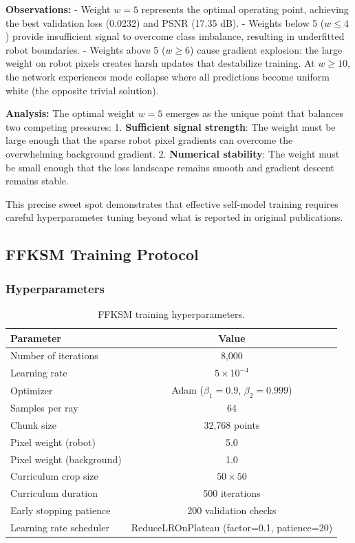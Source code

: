 \documentclass[12pt,a4paper,oneside]{report}
\begin{document}
\textbf{Observations:}
- Weight $w = 5$ represents the optimal operating point, achieving the best validation loss (0.0232) and PSNR (17.35 dB).
- Weights below 5 ($w \leq 4$) provide insufficient signal to overcome class imbalance, resulting in underfitted robot boundaries.
- Weights above 5 ($w \geq 6$) cause gradient explosion: the large weight on robot pixels creates harsh updates that destabilize training. At $w \geq 10$, the network experiences mode collapse where all predictions become uniform white (the opposite trivial solution).

\textbf{Analysis:} The optimal weight $w = 5$ emerges as the unique point that balances two competing pressures:
1. \textbf{Sufficient signal strength}: The weight must be large enough that the sparse robot pixel gradients can overcome the overwhelming background gradient.
2. \textbf{Numerical stability}: The weight must be small enough that the loss landscape remains smooth and gradient descent remains stable.

This precise sweet spot demonstrates that effective self-model training requires careful hyperparameter tuning beyond what is reported in original publications.

\subsection{FFKSM Training Protocol}

\subsubsection{Hyperparameters}

\begin{table}[H]
\centering
\caption{FFKSM training hyperparameters.}
\label{tab:ffksm_hyperparams}
\begin{tabular}{lc}
\toprule
Parameter & Value \\
\midrule
Number of iterations & 8,000 \\
Learning rate & $5 \times 10^{-4}$ \\
Optimizer & Adam ($\beta_1=0.9$, $\beta_2=0.999$) \\
Samples per ray & 64 \\
Chunk size & 32,768 points \\
Pixel weight (robot) & 5.0 \\
Pixel weight (background) & 1.0 \\
Curriculum crop size & $50 \times 50$ \\
Curriculum duration & 500 iterations \\
Early stopping patience & 200 validation checks \\
Learning rate scheduler & ReduceLROnPlateau (factor=0.1, patience=20) \\
\bottomrule
\end{tabular}
\end{table}
\end{document}
